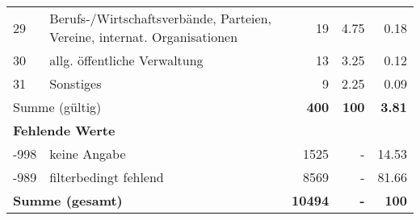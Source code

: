 \begin{longtable}{lXrrr}
        29 & \multicolumn{1}{X}{Berufs-/Wirtschaftsverbände, Parteien, Vereine, internat. Organisationen} & %
          \num{19} &
          \num[round-mode=places,round-precision=2]{4,75} &
          \num[round-mode=places,round-precision=2]{0,18} \\

        30 & \multicolumn{1}{X}{allg. öffentliche Verwaltung} & %
          \num{13} &
          \num[round-mode=places,round-precision=2]{3,25} &
          \num[round-mode=places,round-precision=2]{0,12} \\

        31 & \multicolumn{1}{X}{Sonstiges} & %
          \num{9} &
          \num[round-mode=places,round-precision=2]{2,25} &
          \num[round-mode=places,round-precision=2]{0,09} \\

     \midrule
     \multicolumn{2}{l}{Summe (gültig)} &
       \textbf{\num{400}} &
     \textbf{100} &
       \textbf{\num[round-mode=places,round-precision=2]{3,81}} \\
     \multicolumn{5}{l}{\textbf{Fehlende Werte}}\\
       -998 &
       keine Angabe &
         \num{1525} &
        - &
         \num[round-mode=places,round-precision=2]{14,53} \\
       -989 &
       filterbedingt fehlend &
         \num{8569} &
        - &
         \num[round-mode=places,round-precision=2]{81,66} \\
     \midrule
     \multicolumn{2}{l}{\textbf{Summe (gesamt)}} &
          \textbf{\num{10494}} &
        \textbf{-} &
        \textbf{100} \\
     \bottomrule
     \end{longtable}
     
